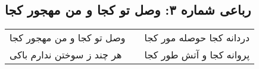 \begin{center}
\section*{رباعی شماره ۳: وصل تو کجا و من مهجور کجا}
\label{sec:sh003}
\begin{longtable}{l p{0.5cm} r}
وصل تو کجا و من مهجور کجا
&&
دردانه کجا حوصله مور کجا
\\
هر چند ز سوختن ندارم باکی
&&
پروانه کجا و آتش طور کجا
\\
\end{longtable}
\end{center}
